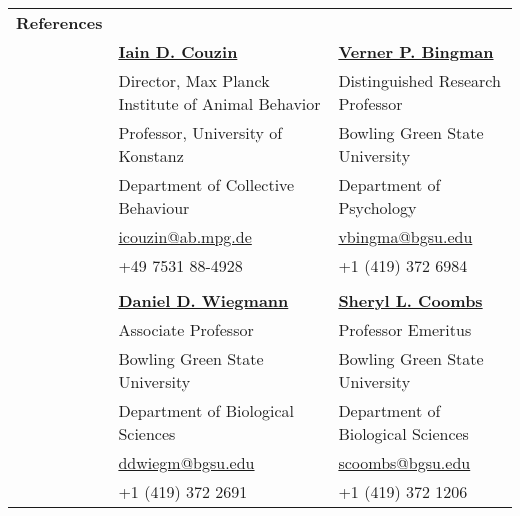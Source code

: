 \documentclass[letterpaper,7pt,oneside]{article}
\begin{document}
\noindent \begin{longtable}{@{} l l l}
 \Large{\textbf{References}} \vspace{5mm} \\
 & \href{http://www.collectivebehaviour.com/couzin}{\textbf{Iain D. Couzin}} & \href{https://www.bgsu.edu/arts-and-sciences/biological-sciences/faculty-and-staff/alphabetical-listing/verner-bingman.html}{\textbf{Verner P. Bingman}} \\
 & Director, Max Planck Institute of Animal Behavior &  Distinguished Research Professor  \\
 & Professor, University of Konstanz &  Bowling Green State University \\
 & Department of Collective Behaviour  & Department of Psychology \\
 & \small{\href{mailto:icouzin@ab.mpg.de}{icouzin@ab.mpg.de}} & \small{\href{mailto:vbingma@bgsu.edu}{vbingma@bgsu.edu}} \\
 &\small{+49 7531 88-4928} & \small{+1 (419) 372 6984} \\
&& \\
  & \href{https://www.bgsu.edu/arts-and-sciences/biological-sciences/faculty-and-staff/alphabetical-listing/daniel-wiegmann.html}{\textbf{Daniel D. Wiegmann}} & \href{https://www.bgsu.edu/arts-and-sciences/neuroscience/nmb-people/faculty/sheryl-coombs.html}{\textbf{Sheryl L. Coombs}} \\
 & Associate Professor  &  Professor Emeritus \\
 & Bowling Green State University & Bowling Green State University \\
 & Department of Biological Sciences  & Department of Biological Sciences \\
 & \small{\href{mailto:ddwiegm@bgsu.edu}{ddwiegm@bgsu.edu}} & \small{\href{mailto:scoombs@bgsu.edu}{scoombs@bgsu.edu}} \\
 &\small{+1 (419) 372 2691} & \small{+1 (419) 372 1206} \\
 
\end{longtable}


\end{document}
